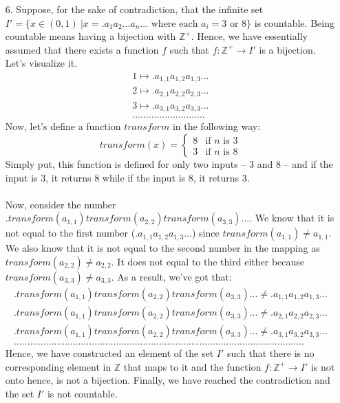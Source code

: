 \documentclass[12pt, a4paper]{article}
\newcommand{\ints}{\mathbb{Z}}
\newcommand{\pints}{\mathbb{Z}^+}
\newcommand{\rarr}{\rightarrow}
\begin{document}
\begin{itemize}
\item[6.]
Suppose, for the sake of contradiction, that the infinite set $I' = \{x \in (0, 1) \ | x = .a_1a_2...a_n... \mbox{ where each $a_i = 3$ or 8}\}$ is countable.
Being countable means having a bijection with $\pints$. Hence, we have essentially assumed that there exists a function $f$ such that
$f : \pints \rarr I'$ is a bijection. Let's visualize it.
\begin{align*}
1 \mapsto .a_{1,1}a_{1,2}a_{1,3}...\\
2 \mapsto .a_{2,1}a_{2,2}a_{2,3}...\\
3 \mapsto .a_{3,1}a_{3,2}a_{3,3}...\\
...........................
\end{align*}
Now, let's define a function $transform$ in the following way:
$$transform(x) = \begin{cases} 8 & \mbox{if } n\mbox{ is 3} \\ 3 & \mbox{if } n\mbox{ is 8} \end{cases}$$
Simply put, this function is defined for only two inputs -- 3 and 8 -- and if the input is 3, it returns 8 while
if the input is 8, it returns 3.\\\\
Now, consider the number $.transform(a_{1,1})transform(a_{2,2})transform(a_{3,3})...$. We know that it is not equal
to the first number ($.a_{1,1}a_{1,2}a_{1,3}...$) since $transform(a_{1,1}) \neq a_{1,1}$. We also know that it is not equal
to the second number in the mapping as $transform(a_{2,2}) \neq a_{2,2}$. It does not equal to the third either because $transform(a_{3,3}) \neq a_{3,3}$.
As a result, we've got that:
\begin{align*}
.transform(a_{1,1})transform(a_{2,2})transform(a_{3,3})... \neq .a_{1,1}a_{1,2}a_{1,3}...\\
.transform(a_{1,1})transform(a_{2,2})transform(a_{3,3})... \neq .a_{2,1}a_{2,2}a_{2,3}...\\
.transform(a_{1,1})transform(a_{2,2})transform(a_{3,3})... \neq .a_{3,1}a_{3,2}a_{3,3}...\\
............................................................................................................
\end{align*}
Hence, we have constructed an element of the set $I'$ such that there is no corresponding element in $\ints$ that maps to it and the function $f : \pints \rarr I'$ is not onto hence, is not a bijection.
Finally, we have reached the contradiction and the set $I'$ is not countable.
\end{itemize}
\end{document}
